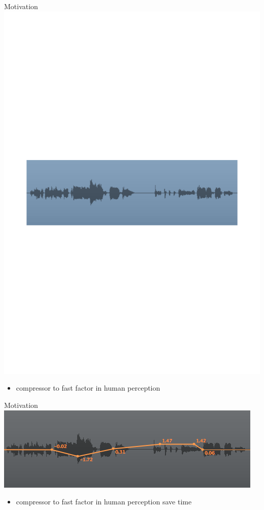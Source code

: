 \begin{frame}[c]{Motivation}{}
	\includegraphics[scale=0.6]{images/wave}
	\centering
	\\
	\begin{itemize}
		\item compressor to fast \inlineitem factor in human perception
	\end{itemize}
\end{frame}

\begin{frame}[c]{Motivation}{}
	\includegraphics[scale=0.6]{images/auto}
	\centering
	\\
	\begin{itemize}
		\item compressor to fast \inlineitem factor in human perception \inlineitem save time
	\end{itemize}
\end{frame}

